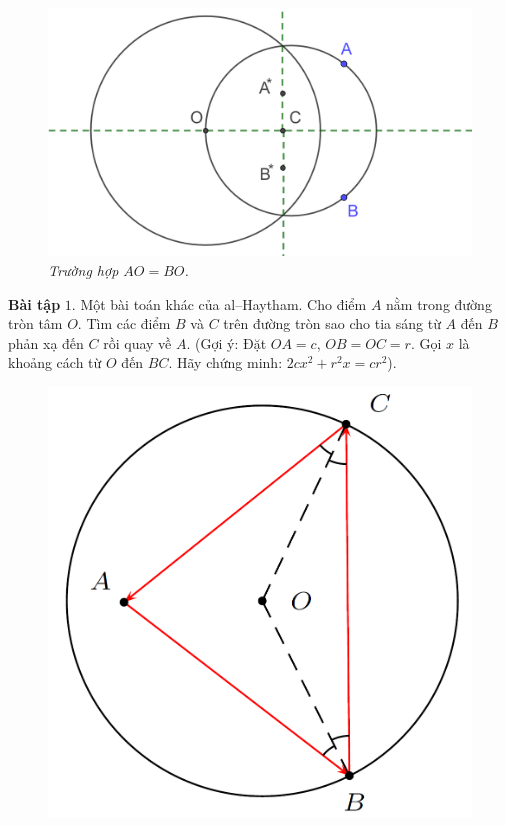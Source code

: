 \begin{multicols}{2}
\begin{figure}[H]
		\vspace*{-10pt}
	\end{figure}
	\begin{figure}[H]
		\vspace*{-5pt}
		\centering
		\captionsetup{labelformat= empty, justification=centering}
		\includegraphics[width= 1\linewidth]{17}
		\caption{\small\textit{\color{lichsutoanhoc}Trường hợp $AO = BO$.}}
		\vspace*{-10pt}
	\end{figure}
	\textbf{\color{lichsutoanhoc}Bài tập}
	\vskip 0.1cm
	$1.$ Một bài toán khác của al--Haytham. Cho điểm $A$ nằm trong đường tròn tâm $O$. Tìm các điểm $B$ và $C$ trên đường tròn sao cho tia sáng từ $A$ đến $B$ phản xạ đến $C$ rồi quay về $A$. (Gợi ý: Đặt $OA = c$, $OB = OC = r$. Gọi $x$ là khoảng cách từ $O$ đến $BC$. Hãy chứng minh: $2cx^2+r^2x=cr^2$).
	\begin{figure}[H]
		\vspace*{-5pt}
		\centering
		\captionsetup{labelformat= empty, justification=centering}
		\includegraphics[width= 0.75\linewidth]{18}

\end{figure}
\end{multicols}
